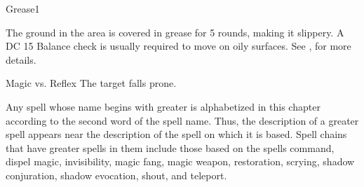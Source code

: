 \begin{spellsection}{Grease}{1}
    \begin{spellheader}
    \end{spellheader}
    \begin{spellcontent}
        \begin{spelltargetinginfo}
        \end{spelltargetinginfo}
        \begin{spelleffects}
            \spelleffect The ground in the area is covered in grease for 5 rounds, making it slippery. A DC 15 Balance check is usually required to move on oily surfaces. See , for more details.
        \end{spelleffects}
    \end{spellcontent}
    \begin{spellsubcontent}
        \begin{spelltargetinginfo}
        \end{spelltargetinginfo}
        \begin{spelleffects}
            \begin{spellattack}{Magic vs. Reflex}
                \spellsuccess The target falls prone.
            \end{spellattack}
        \end{spelleffects}
    \end{spellsubcontent}
    \begin{spellfooter}
        \spellnotes \physicalspellnotes
        \miscastyou
    \end{spellfooter}
\end{spellsection}

\par Any spell whose name begins with greater is alphabetized in this chapter according to the second word of the spell name. Thus, the description of a greater spell appears near the description of the spell on which it is based. Spell chains that have greater spells in them include those based on the spells command, dispel magic, invisibility, magic fang, magic weapon, restoration, scrying, shadow conjuration, shadow evocation, shout, and teleport.

